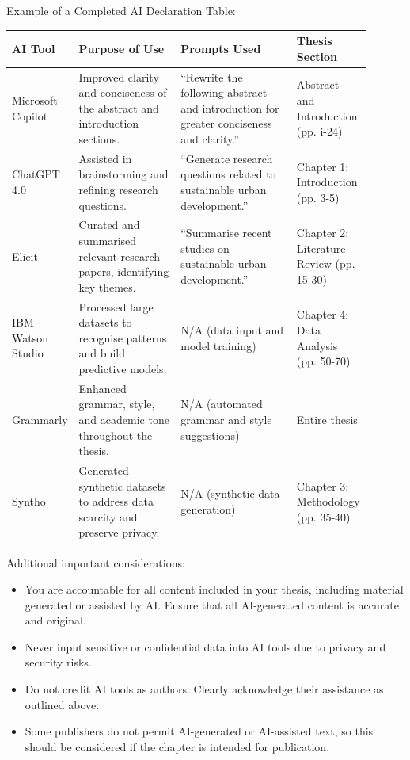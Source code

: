 \begin{instructional}
    \noindent
    Example of a Completed AI Declaration Table:
    
    \noindent
    \begin{table}[h]
    {\color{UQPurple}
        \begin{tabular}{|p{0.10\linewidth} | p{0.30\linewidth} | p{0.35\linewidth} | p{0.15\linewidth}|}
        \hline
        \textbf{AI Tool} & \textbf{Purpose of Use} & \textbf{Prompts Used} & \textbf{Thesis Section} \\
        \hline
        Microsoft Copilot & Improved clarity and conciseness of the abstract and introduction sections. & ``Rewrite the following abstract and introduction for greater conciseness and clarity.'' & Abstract and Introduction (pp. i-24) \\
        \hline
        ChatGPT 4.0 & Assisted in brainstorming and refining research questions. & ``Generate research questions related to sustainable urban development.'' & Chapter 1: Introduction (pp. 3-5) \\
        \hline
        Elicit & Curated and summarised relevant research papers, identifying key themes. & ``Summarise recent studies on sustainable urban development.'' & Chapter 2: Literature Review (pp. 15-30) \\
        \hline
        IBM Watson Studio & Processed large datasets to recognise patterns and build predictive models. & N/A (data input and model training) & Chapter 4: Data Analysis (pp. 50-70) \\
        \hline
        Grammarly & Enhanced grammar, style, and academic tone throughout the thesis. & N/A (automated grammar and style suggestions) & Entire thesis \\
        \hline
        Syntho & Generated synthetic datasets to address data scarcity and preserve privacy. & N/A (synthetic data generation) & Chapter 3: Methodology (pp. 35-40) \\
        \hline
        \end{tabular}
    }
    \end{table}

    \noindent
    Additional important considerations:

    \begin{itemize}
        \item You are accountable for all content included in your thesis, including material generated or assisted by AI. Ensure that all AI-generated content is accurate and original.
        \item Never input sensitive or confidential data into AI tools due to privacy and security risks.
        \item Do not credit AI tools as authors. Clearly acknowledge their assistance as outlined above.
        \item Some publishers do not permit AI-generated or AI-assisted text, so this should be considered if the chapter is intended for publication.
    \end{itemize}
    

\end{instructional}
